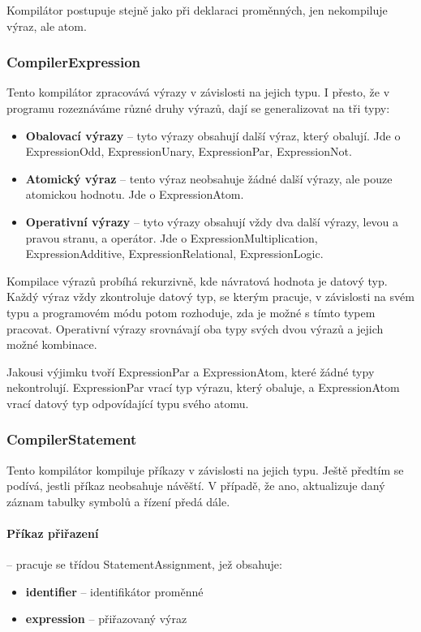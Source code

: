 \documentclass[
12pt,
a4paper,
pdftex,
czech,
titlepage
]{report}
\begin{document}
Kompilátor postupuje stejně jako při deklaraci proměnných, jen nekompiluje výraz, ale atom.

\subsubsection{CompilerExpression}

Tento kompilátor zpracovává výrazy v závislosti na jejich typu. I přesto, že v programu rozeznáváme různé druhy výrazů, dají se generalizovat na tři typy:
\begin{itemize}
\item \textbf{Obalovací výrazy} -- tyto výrazy obsahují další výraz, který obalují. Jde o ExpressionOdd, ExpressionUnary, ExpressionPar, ExpressionNot.
\item \textbf{Atomický výraz} -- tento výraz neobsahuje žádné další výrazy, ale pouze atomickou hodnotu. Jde o ExpressionAtom.
\item \textbf{Operativní výrazy} -- tyto výrazy obsahují vždy dva další výrazy, levou a pravou stranu, a operátor. Jde o ExpressionMultiplication, ExpressionAdditive, ExpressionRelational, ExpressionLogic.
\end{itemize}

Kompilace výrazů probíhá rekurzivně, kde návratová hodnota je datový typ. Každý výraz vždy zkontroluje datový typ, se kterým pracuje, v závislosti na svém typu a programovém módu potom rozhoduje, zda je možné s tímto typem pracovat. Operativní výrazy srovnávají oba typy svých dvou výrazů a jejich možné kombinace.

Jakousi výjimku tvoří ExpressionPar a ExpressionAtom, které žádné typy nekontrolují. ExpressionPar vrací typ výrazu, který obaluje, a ExpressionAtom vrací datový typ odpovídající typu svého atomu.

\subsubsection{CompilerStatement}
Tento kompilátor kompiluje příkazy v závislosti na jejich typu. Ještě předtím se podívá, jestli příkaz neobsahuje návěští. V případě, že ano, aktualizuje daný záznam tabulky symbolů a řízení předá dále.

\paragraph{Příkaz přiřazení} -- pracuje se třídou StatementAssignment, jež obsahuje:
\begin{itemize}
\item \textbf{identifier} -- identifikátor proměnné
\item \textbf{expression} -- přiřazovaný výraz
\end{itemize}
\end{document}
